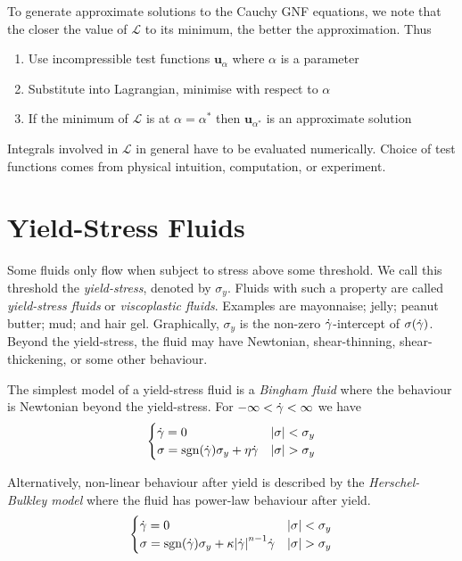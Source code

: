 \documentclass{jknotes}
\begin{document}
To generate approximate solutions to the Cauchy GNF equations, we note that
the closer the value of $\mathcal{L}$ to its minimum, the better the
approximation. Thus
\begin{enumerate}
	\item Use incompressible test functions $\symbf{u}_\alpha$ where $\alpha$ is
		a parameter
	\item Substitute into Lagrangian, minimise with respect to $\alpha$
	\item If the minimum of $\mathcal{L}$ is at $\alpha = \alpha^*$ then
		$\symbf{u}_{\alpha^*}$ is an approximate solution
\end{enumerate}

Integrals involved in $\mathcal{L}$ in general have to be evaluated
numerically. Choice of test functions comes from physical intuition,
computation, or experiment.

\section{Yield-Stress Fluids}
Some fluids only flow when subject to stress above some threshold. We call
this threshold the \emph{yield-stress}, denoted by $\sigma_y$. Fluids with such
a property are called \emph{yield-stress fluids} or \emph{viscoplastic fluids}.
Examples are mayonnaise; jelly; peanut butter; mud; and hair gel. Graphically,
$\sigma_y$ is the non-zero $\dot{\gamma}$-intercept of $\sigma(\dot{\gamma})$. Beyond the
yield-stress, the fluid may have Newtonian, shear-thinning, shear-thickening,
or some other behaviour. 

The simplest model of a yield-stress fluid is a \emph{Bingham fluid} where the
behaviour is Newtonian beyond the yield-stress. For $-\infty < \dot{\gamma} <
\infty$ we have
\begin{equation}
	\begin{cases}
		\dot{\gamma} = 0 & \abs{\sigma} < \sigma_y \\
		\sigma = \text{sgn}(\dot{\gamma})\sigma_y + \eta \dot{\gamma} & \abs{\sigma} > \sigma_y
	\end{cases}
\end{equation}

Alternatively, non-linear behaviour after yield is described by the
\emph{Herschel-Bulkley model} where the fluid has power-law behaviour after
yield. 
\begin{equation}
	\begin{cases}
		\dot{\gamma} = 0 & \abs{\sigma} < \sigma_y \\
		\sigma = \text{sgn}(\dot{\gamma})\sigma_y + \kappa \abs{\dot{\gamma}}^{n-1} \dot{\gamma}
		& \abs{\sigma} > \sigma_y 
	\end{cases}
\end{equation}
\end{document}
